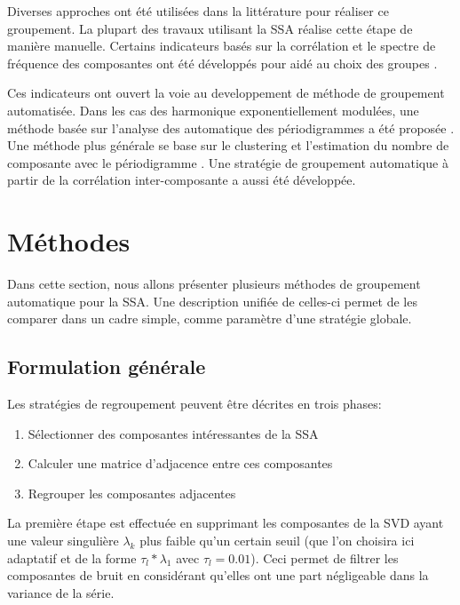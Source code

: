 \documentclass{gretsi}
\begin{document}
Diverses approches ont été utilisées dans la littérature pour réaliser ce groupement. La plupart des travaux utilisant la SSA réalise cette étape de manière manuelle. Certains indicateurs basés sur la corrélation et le spectre de fréquence des composantes ont été développés pour aidé au choix des groupes \cite{GNZ_10_SSA}.

Ces indicateurs ont ouvert la voie au developpement de méthode de groupement automatisée. Dans les cas des harmonique exponentiellement modulées, une méthode basée sur l'analyse des automatique des périodigrammes a été proposée \cite{alexandrov_05_auto}. Une méthode plus générale se base sur le clustering et l'estimation du nombre de composante avec le périodigramme \cite{alvarez_13_auto}. Une stratégie de groupement automatique à partir de la corrélation inter-composante a aussi été développée.



\section{Méthodes}
\label{sec:met}

Dans cette section, nous allons présenter plusieurs méthodes de groupement automatique pour la SSA. Une description unifiée de celles-ci permet de les comparer dans un cadre simple, comme paramètre d'une stratégie globale.

\subsection{Formulation générale}
\label{sub:form}

Les stratégies de regroupement peuvent être décrites en trois phases:
\begin{enumerate}
	\item Sélectionner des composantes intéressantes de la SSA
	\item Calculer une matrice d'adjacence entre ces composantes
	\item Regrouper les composantes adjacentes
\end{enumerate}
La première étape est effectuée en supprimant les composantes de la SVD ayant une valeur singulière $\lambda_k$ plus faible qu'un certain seuil (que l'on choisira ici adaptatif et de la forme  $\tau_l*\lambda_1$ avec $\tau_l = 0.01$). Ceci permet de filtrer les composantes de bruit en considérant qu'elles ont une part négligeable dans la variance de la série. 
\end{document}
